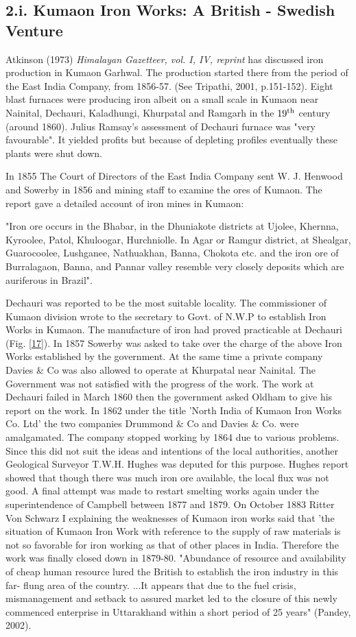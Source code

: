 \subsection*{2.i. Kumaon Iron Works: A British - Swedish Venture}

Atkinson (1973) {\it Himalayan Gazetteer, vol. I, IV, reprint} has discussed iron production in Kumaon Garhwal.  The production started there from the period of the East India Company, from 1856-57. (See Tripathi, 2001, p.151-152). Eight blast furnaces were producing iron albeit on a small scale in Kumaon near Nainital, Dechauri, Kaladhungi, Khurpatal and Ramgarh in the $19^{\rm th}$ century (around 1860). Julius Ramsay's assessment of Dechauri furnace was "very favourable". It yielded profits but because of depleting profiles eventually these plants were shut down.

In 1855 The Court of Directors of the East India Company sent W. J. Henwood and Sowerby in 1856 and mining staff to examine the ores of Kumaon. The report gave a detailed account of iron mines in Kumaon:

"Iron ore occurs in the Bhabar, in the Dhuniakote districts at Ujolee, Khernna, Kyroolee, Patol, Khuloogar, Hurchniolle. In Agar or Ramgur district, at Shealgar, Guarocoolee, Lushganee, Nathuakhan, Banna, Chokota etc. and the iron ore of Burralagaon, Banna, and Pannar valley resemble very closely deposits which are auriferous in Brazil".

Dechauri was reported to be the most suitable locality. The commissioner of Kumaon division wrote to the secretary to Govt. of N.W.P to establish Iron Works in Kumaon. The manufacture of iron had proved practicable at Dechauri (Fig. \ref{17}). In 1857 Sowerby was asked to take over the charge of the above Iron Works established by the government. At the same time a private company Davies \& Co was also allowed to operate at Khurpatal near Nainital. The Government was not satisfied with the progress of the work. The work at Dechauri failed in March 1860 then the government asked Oldham to give his report on the work. In 1862 under the title 'North India of Kumaon Iron Works Co. Ltd' the two companies Drummond \& Co and Davies \& Co. were amalgamated. The company stopped working by 1864 due to various problems. Since this did not suit the ideas and intentions of the local authorities, another Geological Surveyor T.W.H. Hughes was deputed for this purpose. Hughes report showed that though there was much iron ore available, the local flux was not good. A final attempt was made to restart smelting works again under the superintendence of Campbell between 1877 and 1879. On October 1883 Ritter Von Schwarz I explaining the weaknesses of Kumaon iron works said that 'the situation of Kumaon Iron Work with reference to the supply of raw materials is not so favorable for iron working as that of other places in India. Therefore the work was finally closed down in 1879-80. "Abundance of resource and availability of cheap human resource lured the British to establish the iron industry in this far- flung area of the country. ...It appears that due to the fuel crisis, mismanagement and setback to assured market led to the closure of this newly commenced enterprise in Uttarakhand within a short period of 25 years" (Pandey, 2002).

